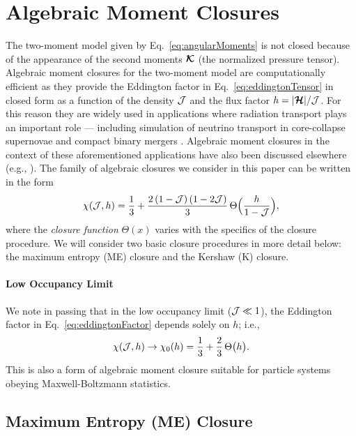\section{Algebraic Moment Closures}
\label{sec:algebraicClosure}

The two-moment model given by Eq.~\eqref{eq:angularMoments} is not closed because of the appearance of the second moments $\boldsymbol{\mathcal{K}}$ (the normalized pressure tensor).  
Algebraic moment closures for the two-moment model are computationally efficient as they provide the Eddington factor in Eq.~\eqref{eq:eddingtonTensor} in closed form as a function of the density $\mathcal{J}$ and the flux factor $h=|\boldsymbol{\mathcal{H}}|/\mathcal{J}$.  
For this reason they are widely used in applications where radiation transport plays an important role --- including simulation of neutrino transport in core-collapse supernovae \cite{roberts_etal_2016} and compact binary mergers \cite{foucart_etal_2015}.  
Algebraic moment closures in the context of these aforementioned applications have also been discussed elsewhere (e.g., \cite{pons_etal_2000,smit_etal_2000,just_etal_2015,murchikova_etal_2017}).  
The family of algebraic closures we consider in this paper can be written in the form \cite{cernohorskyBludman_1994}
\begin{equation}
  \chi(\mathcal{J},h)=\frac{1}{3}+\frac{2\,(1-\mathcal{J})\,(1-2\mathcal{J})}{3}\,\Theta\Big(\frac{h}{1-\mathcal{J}}\Big),
  \label{eq:eddingtonFactor}
\end{equation}
where the \emph{closure function} $\Theta(x)$ varies with the specifics of the closure procedure.  
We will consider two basic closure procedures in more detail below: the maximum entropy (ME) closure and the Kershaw (K) closure.  

\paragraph{Low Occupancy Limit}
We note in passing that in the low occupancy limit ($\mathcal{J}\ll1$), the Eddington factor in Eq.~\eqref{eq:eddingtonFactor} depends solely on $h$; i.e.,
\begin{equation}
  \chi(\mathcal{J},h)\to\chi_{0}(h)=\frac{1}{3}+\frac{2}{3}\,\Theta\big(h\big).  
  \label{eq:eddingtonFactorLow}
\end{equation}
This is also a form of algebraic moment closure suitable for particle systems obeying Maxwell-Boltzmann statistics.  

\subsection{Maximum Entropy (ME) Closure}

